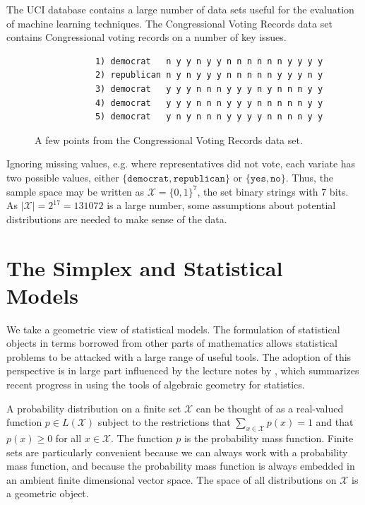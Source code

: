 \documentclass[cclicense]{hmcthesis}
\providecommand*{\xs}{\mathcal X}
\numberwithin{equation}{chapter}
\numberwithin{thmcounter}{chapter}
\begin{document}
    \begin{example}
        The UCI database \citep{UCIData} contains a large number of data sets
        useful for the evaluation of machine learning techniques.  The
        Congressional Voting Records data set contains Congressional voting
        records on a number of key issues.
        \begin{figure}[H]
            \centering
            \begin{verbatim}
            1) democrat   n y y n y y n n n n n n y y y y
            2) republican n y n y y y n n n n n y y y n y
            3) democrat   y y y n n n y y y n y n n n y y
            4) democrat   y y y n n n y y y n n n n n y y
            5) democrat   y n y n n n y y y y n n n n y y
            \end{verbatim}
            \vspace{-1.5\baselineskip}
            \caption{A few points from the Congressional Voting Records
            data set.}
        \end{figure}
        \noindent Ignoring missing values, e.g. where representatives did not
        vote, each variate has two possible values, either $\{\texttt{democrat},
        \texttt{republican}\}$ or $\{\texttt{yes}, \texttt{no}\}$.  Thus, the
        sample space may be written as $\xs = \{0, 1\}^7$, the set binary
        strings with 7 bits.  As $|\xs| = 2^{17} = 131072$ is a large number,
        some assumptions about potential distributions are needed to make sense
        of the data.
        \label{ex:binary-voting}
    \end{example}


    \section{The Simplex and Statistical Models}

    We take a geometric view of statistical models.  The formulation of
    statistical objects in terms borrowed from other parts of mathematics allows
    statistical problems to be attacked with a large range of useful tools.  The
    adoption of this perspective is in large part influenced by the lecture
    notes by \citet{DSS08}, which summarizes recent progress in using the tools
    of algebraic geometry for statistics.

    A probability distribution on a finite set $\xs$ can be thought of as a
    real-valued function $p \in L(\xs)$ subject to the restrictions that
    $\sum_{x\in \xs} p(x) = 1$ and that $p(x) \ge 0$ for all $x \in \xs$.  The
    function $p$ is the probability mass function.  Finite sets are particularly
    convenient because we can always work with a probability mass function, and
    because the probability mass function is always embedded in an ambient
    finite dimensional vector space.  The space of all distributions on $\xs$ is
    a geometric object.
    
\end{document}
